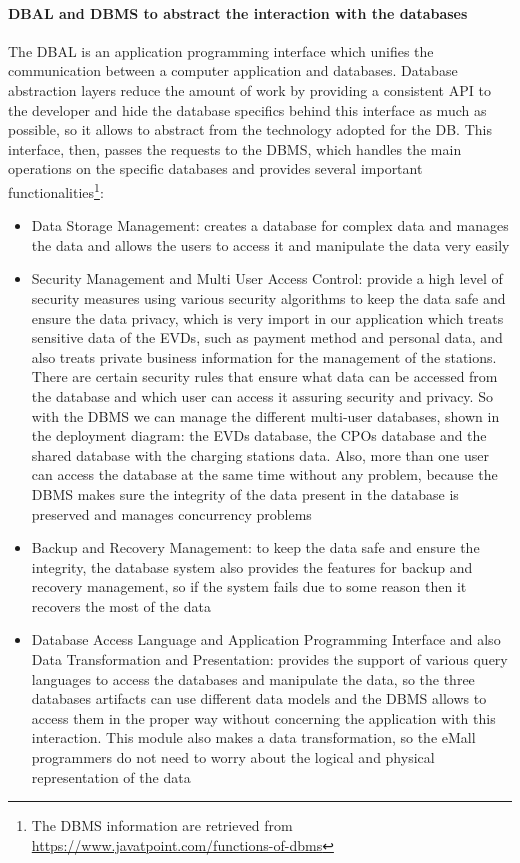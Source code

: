\paragraph{DBAL and DBMS to abstract the interaction with the databases}
The DBAL is an application programming interface which unifies the communication between a computer application and databases. Database abstraction layers reduce the amount of work by providing a consistent API to the developer and hide the database specifics behind this interface as much as possible, so it allows to abstract from the technology adopted for the DB. This interface, then, passes the requests to the DBMS, which handles the main operations on the specific databases and provides several important functionalities\footnote{The DBMS information are retrieved from \url{https://www.javatpoint.com/functions-of-dbms}}:
\begin{itemize}
    \item Data Storage Management: creates a database for complex data and manages the data and allows the users to access it and manipulate the data very easily 
    \item Security Management and Multi User Access Control: provide a high level of security measures using various security algorithms to keep the data safe and ensure the data privacy, which is very import in our application which treats sensitive data of the EVDs, such as payment method and personal data, and also treats private business information for the management of the stations. There are certain security rules that ensure what data can be accessed from the database and which user can access it assuring security and privacy. So with the DBMS we can manage the different multi-user databases, shown in the deployment diagram: the EVDs database, the CPOs database and the shared database with the charging stations data. Also, more than one user can access the database at the same time without any problem, because the DBMS makes sure the integrity of the data present in the database is preserved and manages concurrency problems
    \item Backup and Recovery Management: to keep the data safe and ensure the integrity, the database system also provides the features for backup and recovery management, so if the system fails due to some reason then it recovers the most of the data 
    \item Database Access Language and Application Programming Interface and also Data Transformation and Presentation: provides the support of various query languages to access the databases and manipulate the data, so the three databases artifacts can use different data models and the DBMS allows to access them in the proper way without concerning the application with this interaction. This module also makes a data transformation, so the eMall programmers do not need to worry about the logical and physical representation of the data 
\end{itemize}


